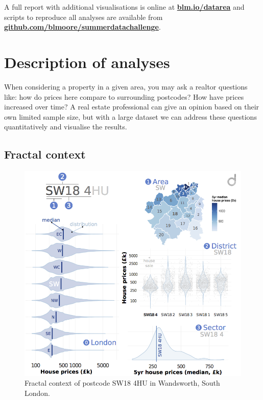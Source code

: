 \documentclass[
10pt, %
a4paper, %
oneside, %
headinclude,footinclude, %
BCOR5mm, %
]{scrartcl}
\begin{document}
A full report with additional visualisations is online at {\bf
  \href{http://blm.io/datarea}{blm.io/datarea} }and scripts to
reproduce all analyses are available from {\bf
  \href{http://github.com/blmoore/summerdatachallenge}{github.com/blmoore/summerdatachallenge}}.


{\let\thefootnote\relax{}}




\section{Description of analyses}

When considering a property in a given area, you may ask a realtor
questions like: how do prices here compare to surrounding postcodes?
How have prices increased over time?  A real estate professional can
give an opinion based on their own limited sample size, but with a
large dataset we can address these questions quantitatively and
visualise the results.

\subsection{Fractal context}

\setlength{\intextsep}{0em}
\begin{figure}
\begin{center}
\includegraphics[width=.44\textwidth]{Figures/fractal.png}
\caption{ Fractal context of postcode SW18 4HU in Wandsworth, South London.}
\end{center}
\end{figure}
\end{document}
